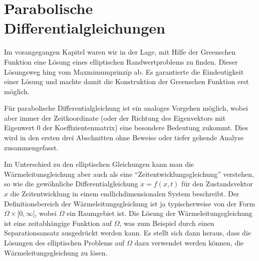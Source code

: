 %
%
%
\chapter{Parabolische Differentialgleichungen\label{chapter-parabolisch}}
\rhead{}
Im vorangegangen Kapitel waren wir in der Lage, mit Hilfe der Greenschen
Funktion eine Lösung eines elliptischen Randwertproblems zu finden.
Dieser Lösungsweg hing vom Maxmimumprinzip ab.
Es garantierte die Eindeutigkeit einer
Lösung und machte damit die Konstruktion der Greenschen Funktion
erst möglich.

Für parabolische Differentialgleichung ist ein analoges Vorgehen
möglich, wobei aber immer der Zeitkoordinate (oder der Richtung
des Eigenvektors mit Eigenwert $0$ der Koeffizientenmatrix)
eine besondere Bedeutung zukommt.
Dies wird in den ersten drei
Abschnitten ohne Beweise  oder tiefer gehende Analyse zusammengefasst.

Im Unterschied zu den elliptischen
Gleichungen kann man die Wärmeleitunsgleichung aber auch
als eine ``Zeitentwicklungsgleichung'' verstehen, so wie die
gewöhnliche Differentialgleichung $\dot x=f(x,t)$
für den Zustandsvektor $x$ die Zeitentwicklung in einem endlichdimensionalen
System beschreibt. Der Definitionsbereich der Wärmeleitungsgleichung
ist ja typischerweise von der Form $\Omega\times[0,\infty[$, wobei
$\Omega$ ein Raumgebiet ist.
Die Lösung der Wärmeleitungsgleichung ist eine zeitabhängige Funktion
auf $\Omega$, was zum Beispiel durch einen Separationsansatz
ausgedrückt werden kann. Es stellt sich dann heraus, dass die Lösungen
des elliptischen Problems auf $\Omega$ dazu verwendet werden können,
die Wärmeleitungsgleichung zu lösen.









